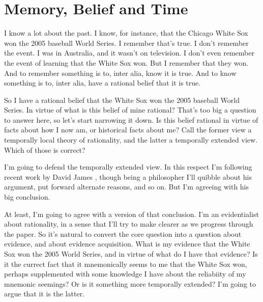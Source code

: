 \chapter{Memory, Belief and Time}


I know a lot about the past. I know, for instance, that the Chicago White Sox won the 2005 baseball World Series. I remember that's true. I don't remember the event. I was in Australia, and it wasn't on television. I don't even remember the event of learning that the White Sox won. But I remember that they won. And to remember something is to, inter alia, know it is true. And to know something is to, inter alia, have a rational belief that it is true.

So I have a rational belief that the White Sox won the 2005 baseball World Series. In virtue of what is this belief of mine rational? That's too big a question to answer here, so let's start narrowing it down. Is this belief rational in virtue of facts about how I now am, or historical facts about me? Call the former view a temporally local theory of rationality, and the latter a temporally extended view. Which of those is correct?

I'm going to defend the temporally extended view. In this respect I'm following recent work by David James  \citet{Barnett2015}, though being a philosopher I'll quibble about his argument, put forward alternate reasons, and so on. But I'm agreeing with his big conclusion.

At least, I'm going to agree with a version of that conclusion. I'm an evidentialist about rationality, in a sense that I'll try to make clearer as we progress through the paper. So it's natural to convert the core question into a question about evidence, and about evidence acquisition. What is my evidence that the White Sox won the 2005 World Series, and in virtue of what do I have that evidence? Is it the currect fact that it mnemonically seems to me that the White Sox won, perhaps supplemented with some knowledge I have about the reliabiity of my mnemonic seemings? Or is it something more temporally extended? I'm going to argue that it is the latter.

